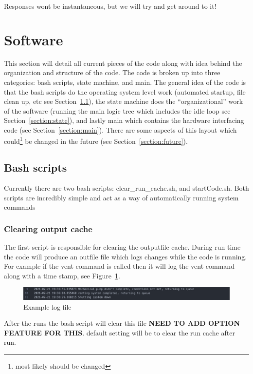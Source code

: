 \documentclass{article}
\begin{document}
Responses wont be instantaneous, but we will try and get around to it!

\section{Software}
\label{section:software}
This section will detail all current pieces of the code along with idea behind the organization and structure of the code. The code is broken up into three categories: bash scripts, state machine, and main. The general idea of the code is that the bash scripts do the operating system level work (automated startup, file clean up, etc see Section~\ref{section:bash}), the state machine does the ``organizational'' work of the software (running the main logic tree which includes the idle loop see Section~\ref{section:state}), and lastly main which contains the hardware interfacing code (see Section~\ref{section:main}). There are some aspects of this layout which could\footnote{most likely should be changed} be changed in the future (see Section~\ref{section:future}).

\subsection{Bash scripts}
\label{section:bash}
Currently there are two bash scripts: clear\_run\_cache.sh, and startCode.sh. Both scripts are incredibly simple and act as a way of automatically running system commands

\subsubsection{Clearing output cache}
The first script is responsible for clearing the outputfile cache. During run time the code will produce an outfile file which logs changes while the code is running. For example if the vent command is called then it will log the vent command along with a time stamp, see Figure~\ref{fig:logfile}. 
\begin{center}
    \begin{figure}[h!]
      \includegraphics[scale=0.4]{image1.png}
      \caption{Example log file}
      \label{fig:logfile}
    \end{figure}
\end{center}


After the runs the bash script will clear this file \textbf{NEED TO ADD OPTION FEATURE FOR THIS}. default setting will be to clear the run cache after run.\\
\end{document}
